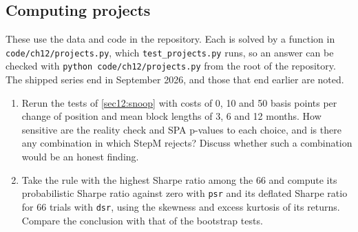 \begin{chapterrefs}
\subsection*{Computing projects}
\label{sec12:projects}
These use the data and code in the repository. Each is solved by a function in
\texttt{code/ch12/projects.py}, which \texttt{test\_projects.py} runs, so an answer can be
checked with \texttt{python code/ch12/projects.py} from the root of the repository. The
shipped series end in September 2026, and those that end earlier are noted.

\begin{enumerate}[label=\textbf{P12.\arabic*}, leftmargin=*, ref=P12.\arabic*]
\item Rerun the tests of \cref{sec12:snoop} with costs of 0, 10 and 50 basis points per change of position
and mean block lengths of 3, 6 and 12 months. How sensitive are the reality check and SPA p-values to each
choice, and is there any combination in which StepM rejects? Discuss whether such a combination would be
an honest finding.
\item Take the rule with the highest Sharpe ratio among the 66 and compute its probabilistic Sharpe ratio
against zero with \texttt{psr} and its deflated Sharpe ratio for 66 trials with \texttt{dsr}, using the
skewness and excess kurtosis of its returns. Compare the conclusion with that of the bootstrap tests.
\end{enumerate}


\end{chapterrefs}
